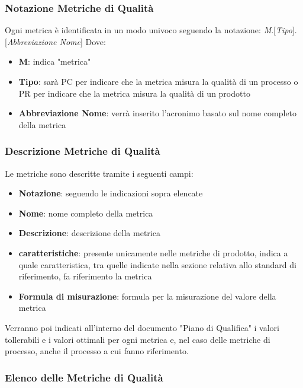 \subsubsection{Notazione Metriche di Qualità}
Ogni metrica è identificata in un modo univoco seguendo la notazione: \textsl{M}.[\textsl{Tipo}].[\textsl{Abbreviazione Nome}]
Dove:
\begin{itemize}
    \item \textbf{M}: indica "metrica"
    \item \textbf{Tipo}: sarà PC per indicare che la metrica misura la qualità di un processo o PR per indicare che la metrica misura la qualità di un prodotto
    \item \textbf{Abbreviazione Nome}: verrà inserito l'acronimo basato sul nome completo della metrica  
\end{itemize}
\subsubsection{Descrizione Metriche di Qualità}
Le metriche sono descritte tramite i seguenti campi:
\begin{itemize}
    \item \textbf{Notazione}: seguendo le indicazioni sopra elencate
    \item \textbf{Nome}: nome completo della metrica 
    \item \textbf{Descrizione}: descrizione della metrica 
    \item \textbf{caratteristiche}: presente unicamente nelle metriche di prodotto, indica a quale caratteristica, tra quelle indicate nella sezione relativa allo standard di riferimento, fa riferimento la metrica
    \item \textbf{Formula di misurazione}: formula per la misurazione del valore della metrica 
\end{itemize}
Verranno poi indicati all'interno del documento "Piano di Qualifica" i valori tollerabili e i valori ottimali per ogni metrica e, nel caso delle metriche di processo, anche il processo a cui fanno riferimento.
\subsubsection{Elenco delle Metriche di Qualità} 